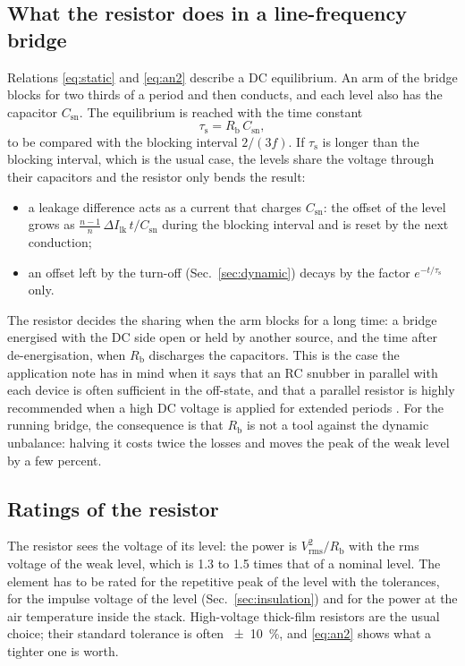 \documentclass[10pt,a4paper]{scrartcl}
\newcommand{\Csn}{C_\mathrm{sn}}
\newcommand{\Rb}{R_\mathrm{b}}
\newcommand{\taus}{\tau_\mathrm{s}}
\newcommand{\Ilk}{I_\mathrm{lk}}
\begin{document}
\subsection{What the resistor does in a line-frequency bridge}
\label{sec:rbrole}
Relations \eqref{eq:static} and \eqref{eq:an2} describe a DC equilibrium. An arm of the bridge blocks for two thirds of a period and then conducts, and each level also has the capacitor $\Csn$. The equilibrium is reached with the time constant
\begin{equation}
\taus = \Rb\,\Csn ,
\end{equation}
to be compared with the blocking interval $2/(3f)$. If $\taus$ is longer than the blocking interval, which is the usual case, the levels share the voltage through their capacitors and the resistor only bends the result:
\begin{itemize}
\item a leakage difference acts as a current that charges $\Csn$: the offset of the level grows as $\tfrac{n-1}{n}\,\Delta\Ilk\,t/\Csn$ during the blocking interval and is reset by the next conduction;
\item an offset left by the turn-off (Sec.~\ref{sec:dynamic}) decays by the factor $e^{-t/\taus}$ only.
\end{itemize}
The resistor decides the sharing when the arm blocks for a long time: a bridge energised with the DC side open or held by another source, and the time after de-energisation, when $\Rb$ discharges the capacitors. This is the case the application note has in mind when it says that an RC snubber in parallel with each device is often sufficient in the off-state, and that a parallel resistor is highly recommended when a high DC voltage is applied for extended periods \cite[Sec.~2.2.1]{an6531}. For the running bridge, the consequence is that $\Rb$ is not a tool against the dynamic unbalance: halving it costs twice the losses and moves the peak of the weak level by a few percent.

\subsection{Ratings of the resistor}
The resistor sees the voltage of its level: the power is $V_\mathrm{rms}^2/\Rb$ with the rms voltage of the weak level, which is 1.3 to 1.5 times that of a nominal level. The element has to be rated for the repetitive peak of the level with the tolerances, for the impulse voltage of the level (Sec.~\ref{sec:insulation}) and for the power at the air temperature inside the stack. High-voltage thick-film resistors are the usual choice; their standard tolerance is often \SI{\pm10}{\percent}, and \eqref{eq:an2} shows what a tighter one is worth.
\end{document}
